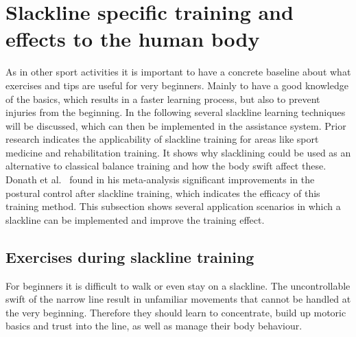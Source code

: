 \section{Slackline specific training and effects to the human body}\label{2_2_slacklineTraining}

As in other sport activities it is important to have a concrete baseline about what exercises and tips are useful for very beginners. Mainly to have a good knowledge of the basics, which results in a faster learning process, but also to prevent injuries from the beginning. In the following several slackline learning techniques will be discussed, which can then be implemented in the assistance system. Prior research indicates the applicability of slackline training for areas like sport medicine and rehabilitation training. It shows why slacklining could be used as an alternative to classical balance training and how the body swift affect these. Donath et al.~\cite{Donath2016-rt} found in his meta-analysis significant improvements in the postural control after slackline training, which indicates the efficacy of this training method. This subsection shows several application scenarios in which a slackline can be implemented and improve the training effect.

\subsection{Exercises during slackline training}

For beginners it is difficult to walk or even stay on a slackline. The uncontrollable swift of the narrow line result in unfamiliar movements that cannot be handled at the very beginning. Therefore they should learn to concentrate, build up motoric basics and trust into the line, as well as manage their body behaviour.

